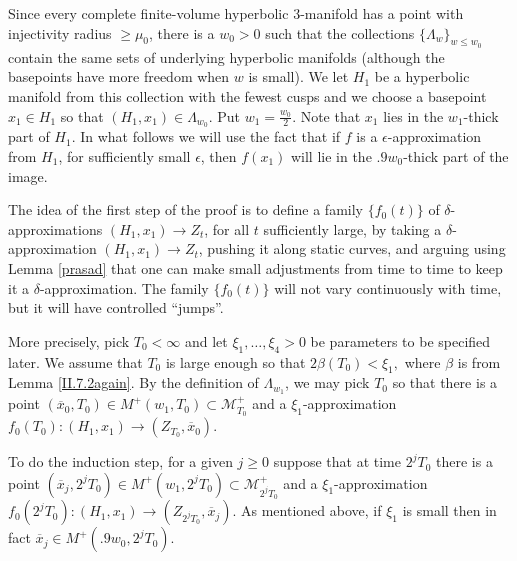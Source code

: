 \documentclass[12pt]{amsart}
\newcommand{\La}{\Lambda}
\newcommand{\M}{{\mathcal M}}
\newcommand{\de}{\delta}
\newcommand{\ra}{\rightarrow}
\numberwithin{equation}{section}
\theoremstyle{plain}
\theoremstyle{definition}
\theoremstyle{remark}
\begin{document}
Since every complete finite-volume hyperbolic $3$-manifold
has a point with injectivity radius $\geq \mu_0$, 
there is a $w_0>0$ such that the collections $\{\La_w\}_{w\leq w_0}$
contain the same sets of underlying hyperbolic manifolds
(although the basepoints have more freedom when $w$ is small).
We let $H_1$ be a hyperbolic manifold from this
collection with the fewest
cusps and we choose a basepoint $x_1\in H_1$ so that
$(H_1,x_1)\in \La_{w_0}$.   Put $w_1= \frac{w_0}{2}$. 
Note that $x_1$ lies in the $w_1$-thick part of $H_1$.
In what follows we will use the fact that if $f$ is a
$\epsilon$-approximation from $H_1$, for sufficiently small
$\epsilon$, then $f(x_1)$ will lie in the $.9 w_0$-thick part of
the image.

The idea of the first step of the proof is to define a family $\{f_0(t)\}$
of $\de$-approximations $(H_1,x_1)\ra Z_t$, 
for all $t$ sufficiently large, by taking 
  a $\de$-approximation $(H_1,x_1)\ra Z_t$,
pushing it along static curves, and arguing using Lemma \ref{prasad}
that one can make small adjustments from time to time
to keep it a $\de$-approximation. The family $\{f_0(t)\}$
will not vary continuously with time, but it will have controlled
``jumps''.

More precisely, pick $T_0<\infty$ and let $\xi_1,\ldots,\xi_4>0$ be
parameters to be specified later.
We assume that $T_0$ is large enough so that 
$
2\beta(T_0)<\xi_1,
$
where $\beta$ is from Lemma \ref{II.7.2again}.
By the definition of $\La_{w_1}$, we may pick $T_0$ so that there
is a point 
$(\overline{x}_0,T_0)\in M^+(w_1,T_0)\subset\M_{T_0}^+$ 
and a $\xi_1$-approximation $f_0(T_0):(H_1,x_1)\ra (Z_{T_0},
\overline{x}_0)$.

To do the induction step, for a given $j \ge 0$ suppose that at time $2^j T_0$ 
there is a point
$(\overline{x}_j, 2^j T_0)\in M^+(w_1,2^j T_0)\subset\M_{2^j T_0}^+$ 
and a $\xi_1$-approximation $f_0(2^j T_0):(H_1,x_1)\ra 
(Z_{2^j T_0},\overline{x}_j)$. As mentioned above, if
$\xi_1$ is small then in fact $\overline{x}_j \in M^+(.9 w_0,2^j T_0)$.
\end{document}
